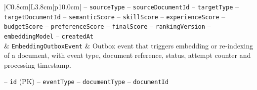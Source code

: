 \begin{center}
\begin{longtable}{|C{0.8cm}|L{3.8cm}|p{10.0cm}|}
\hspace*{1em}-- \texttt{source\allowbreak Type} \newline
\hspace*{1em}-- \texttt{source\allowbreak Document\allowbreak Id} \newline
\hspace*{1em}-- \texttt{target\allowbreak Type} \newline
\hspace*{1em}-- \texttt{target\allowbreak Document\allowbreak Id} \newline
\hspace*{1em}-- \texttt{semantic\allowbreak Score} \newline
\hspace*{1em}-- \texttt{skill\allowbreak Score} \newline
\hspace*{1em}-- \texttt{experience\allowbreak Score} \newline
\hspace*{1em}-- \texttt{budget\allowbreak Score} \newline
\hspace*{1em}-- \texttt{preference\allowbreak Score} \newline
\hspace*{1em}-- \texttt{final\allowbreak Score} \newline
\hspace*{1em}-- \texttt{ranking\allowbreak Version} \newline
\hspace*{1em}-- \texttt{embedding\allowbreak Model} \newline
\hspace*{1em}-- \texttt{created\allowbreak At} \\
 & \texttt{Embedding\allowbreak Outbox\allowbreak Event} & Outbox event that triggers embedding or re-indexing of a document, with event type, document reference, status, attempt counter and processing timestamp.\par\smallskip
\hspace*{1em}-- \texttt{id} (PK) \newline
\hspace*{1em}-- \texttt{event\allowbreak Type} \newline
\hspace*{1em}-- \texttt{document\allowbreak Type} \newline
\hspace*{1em}-- \texttt{document\allowbreak Id} \newline

\end{longtable}
\end{center}

